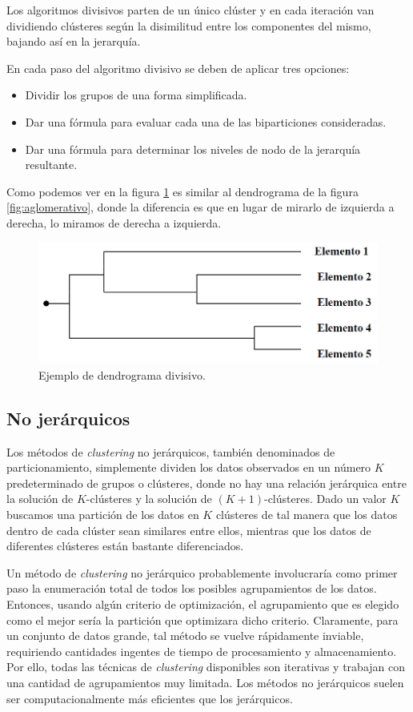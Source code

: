 \documentclass[a4paper, 20pt]{article}
\begin{document}
Los algoritmos divisivos parten de un único clúster y en cada iteración van dividiendo clústeres según la disimilitud entre los componentes del mismo, bajando así en la jerarquía.

En cada paso del algoritmo divisivo se deben de aplicar tres opciones:

\begin{itemize}
	\item Dividir los grupos de una forma simplificada.
	\item Dar una fórmula para evaluar cada una de las biparticiones consideradas.
	\item Dar una fórmula para determinar los niveles de nodo de la jerarquía resultante.
\end{itemize}

Como podemos ver en la figura \ref{fig:divisivo} es similar al dendrograma de la figura \ref{fig:aglomerativo}, donde la diferencia es que en lugar de mirarlo de izquierda a derecha, lo miramos de derecha a izquierda.
\begin{figure}[H]
	\centering
	\includegraphics[scale=0.7]{victoria/disociativo}
	\caption{Ejemplo de dendrograma divisivo.}
	\label{fig:divisivo}
\end{figure}




\subsection{No jerárquicos}
Los métodos de \textit{clustering} no jerárquicos, también denominados de particionamiento, simplemente  dividen los datos observados en un número $K$ predeterminado de grupos o clústeres, donde no hay una relación jerárquica entre la solución de $K$-clústeres y la solución de $(K+1)$-clústeres. Dado un valor $K$ buscamos una partición de los datos en $K$ clústeres de tal manera que los datos dentro de cada clúster sean similares entre ellos, mientras que los datos de diferentes clústeres están bastante diferenciados.
 
Un método de \textit{clustering} no jerárquico probablemente involucraría como primer paso la enumeración total de todos los posibles agrupamientos de los datos. Entonces, usando algún criterio de optimización, el agrupamiento que es elegido como el mejor sería la partición que optimizara dicho criterio. Claramente, para un conjunto de datos grande, tal método se vuelve rápidamente inviable, requiriendo cantidades ingentes de tiempo de procesamiento y almacenamiento. Por ello, todas las técnicas de \textit{clustering} disponibles son iterativas y trabajan con una cantidad de agrupamientos muy limitada. Los métodos no jerárquicos suelen ser computacionalmente más eficientes que los jerárquicos.
\end{document}
